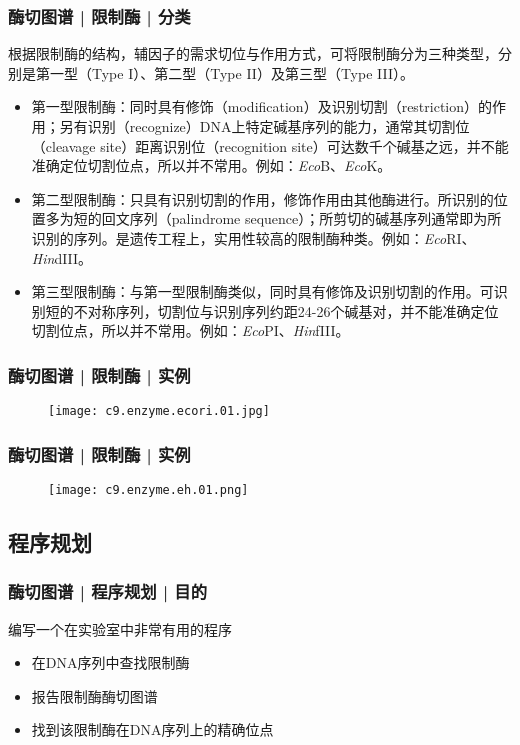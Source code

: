 \begin{frame}
  \frametitle{酶切图谱 | 限制酶 | 分类}
  根据限制酶的结构，辅因子的需求切位与作用方式，可将限制酶分为三种类型，分别是第一型（Type I）、第二型（Type II）及第三型（Type III）。
  \begin{itemize}
    \item 第一型限制酶：同时具有修饰（modification）及识别切割（restriction）的作用；另有识别（recognize）DNA上特定碱基序列的能力，通常其切割位（cleavage site）距离识别位（recognition site）可达数千个碱基之远，并不能准确定位切割位点，所以并不常用。例如：\textit{Eco}B、\textit{Eco}K。
    \item 第二型限制酶：只具有识别切割的作用，修饰作用由其他酶进行。所识别的位置多为短的\alert{回文序列（palindrome sequence）}；所剪切的碱基序列通常即为所识别的序列。是遗传工程上，实用性较高的限制酶种类。例如：\textit{Eco}RI、\textit{Hin}dIII。
    \item 第三型限制酶：与第一型限制酶类似，同时具有修饰及识别切割的作用。可识别短的不对称序列，切割位与识别序列约距24-26个碱基对，并不能准确定位切割位点，所以并不常用。例如：\textit{Eco}PI、\textit{Hin}fIII。
  \end{itemize}
\end{frame}

\begin{frame}
  \frametitle{酶切图谱 | 限制酶 | 实例}
  \begin{figure}
    \centering
    \texttt{[image: c9.enzyme.ecori.01.jpg]}
  \end{figure}
\end{frame}

\begin{frame}
  \frametitle{酶切图谱 | 限制酶 | 实例}
  \begin{figure}
    \centering
    \texttt{[image: c9.enzyme.eh.01.png]}
  \end{figure}
\end{frame}

\subsection{程序规划}
\begin{frame}
  \frametitle{酶切图谱 | 程序规划 | 目的}
  \begin{block}{编写一个在实验室中非常有用的程序}
    \begin{itemize}
      \item 在DNA序列中查找限制酶
      \item 报告限制酶酶切图谱
      \item 找到该限制酶在DNA序列上的精确位点
    \end{itemize}
  \end{block}
\end{frame}

